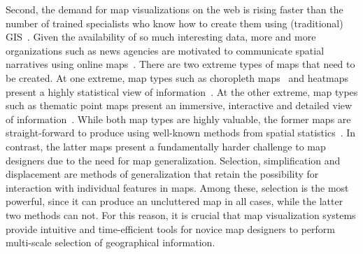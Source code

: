 \documentclass[11pt, oneside]{report}
\begin{document}
{%
Second, the demand for map visualizations on the web is rising faster than the number of trained specialists who know how to create them using (traditional) GIS~\cite{assumption-or-not}. Given the availability of so much interesting data, more and more organizations such as news agencies are motivated to communicate spatial narratives using online maps~\cite{nytimes2010iraq,guardian2013ananas}. There are two extreme types of maps that need to be created. At one extreme, map types such as choropleth maps~\cite{jenks1963generalization} and heatmaps~\cite{wiki2014heatmap} present a highly statistical view of information~\cite{guardian2013ananas}. At the other extreme, map types such as thematic point maps present an immersive, interactive and detailed view of information~\cite{nytimes2010iraq}. While both map types are highly valuable, the former maps are straight-forward to produce using well-known methods from spatial statistics~\cite{ripley2005spatial}. In contrast, the latter maps present a fundamentally harder challenge to map designers due to the need for map generalization. Selection, simplification and displacement are methods of generalization that retain the possibility for interaction with individual features in maps. Among these, selection is the most powerful, since it can produce an uncluttered map in all cases, while the latter two methods can not. For this reason, it is crucial that map visualization systems provide intuitive and time-efficient tools for novice map designers to perform multi-scale selection of geographical information.

}
\end{document}
